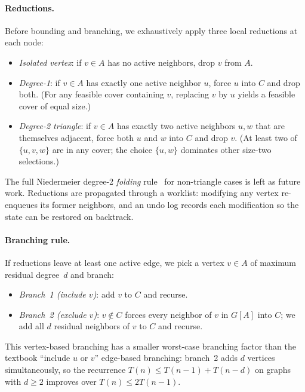 \documentclass[sigconf]{acmart}
\begin{document}
\paragraph{Reductions.} Before bounding and branching, we exhaustively
apply three local reductions at each node:
\begin{itemize}\itemsep=2pt
  \item \emph{Isolated vertex}: if $v \in A$ has no active neighbors,
        drop $v$ from $A$.
  \item \emph{Degree-1}: if $v \in A$ has exactly one active neighbor
        $u$, force $u$ into $C$ and drop both. (For any feasible cover
        containing $v$, replacing $v$ by $u$ yields a feasible cover of
        equal size.)
  \item \emph{Degree-2 triangle}: if $v \in A$ has exactly two active
        neighbors $u, w$ that are themselves adjacent, force both $u$ and
        $w$ into $C$ and drop $v$. (At least two of $\{u, v, w\}$ are in
        any cover; the choice $\{u, w\}$ dominates other size-two
        selections.)
\end{itemize}
The full Niedermeier degree-2 \emph{folding}
rule~\cite{niedermeier2006invitation} for non-triangle cases is
left as future work. Reductions are propagated through a worklist:
modifying any vertex re-enqueues its former neighbors, and an undo
log records each modification so the state can be restored on
backtrack.

\paragraph{Branching rule.} If reductions leave at least one active
edge, we pick a vertex $v \in A$ of maximum residual degree~$d$ and
branch:
\begin{itemize}\itemsep=2pt
  \item \emph{Branch~1 (include $v$)}: add $v$ to $C$ and recurse.
  \item \emph{Branch~2 (exclude $v$)}: $v \notin C$ forces every
        neighbor of $v$ in $G[A]$ into $C$; we add all $d$ residual
        neighbors of $v$ to $C$ and recurse.
\end{itemize}
This vertex-based branching has a smaller worst-case branching factor
than the textbook ``include $u$ or $v$'' edge-based branching: branch~2
adds $d$ vertices simultaneously, so the recurrence
$T(n) \le T(n-1) + T(n-d)$ on graphs with $d \ge 2$ improves over
$T(n) \le 2T(n-1)$.
\end{document}
